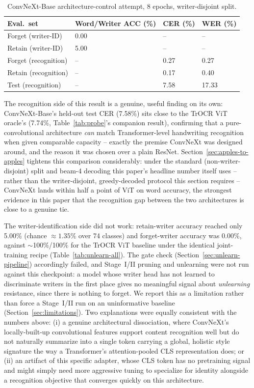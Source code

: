 \documentclass[a4paper,fleqn]{cas-dc}
\begin{document}
\begin{table}[h]
\caption{ConvNeXt-Base architecture-control attempt, 8 epochs, writer-disjoint split.}
\label{tab:convnext}
\begin{tabular*}{\tblwidth}{@{}LLLL@{}}
\toprule
Eval.\ set & Word/Writer ACC (\%) & CER (\%) & WER (\%) \\
\midrule
Forget (writer-ID) & 0.00 & -- & -- \\
Retain (writer-ID) & 5.00 & -- & -- \\
Forget (recognition) & -- & 0.27 & 0.27 \\
Retain (recognition) & -- & 0.17 & 0.40 \\
Test (recognition) & -- & 7.58 & 17.33 \\
\bottomrule
\end{tabular*}
\end{table}

The recognition side of this result is a genuine, useful finding on its
own: ConvNeXt-Base's held-out test CER (7.58\%) sits close to the TrOCR ViT
oracle's (7.74\%, Table~\ref{tab:probe}'s companion result), confirming
that a pure-convolutional architecture \emph{can} match Transformer-level
handwriting recognition when given comparable capacity -- exactly the
premise ConvNeXt was designed around, and the reason it was chosen over a
plain ResNet. Section~\ref{sec:apples-to-apples} tightens this comparison
considerably: under the standard (non-writer-disjoint) split and beam-4
decoding this paper's headline number itself uses -- rather than the
writer-disjoint, greedy-decoded protocol this section requires -- ConvNeXt
lands within half a point of ViT on word accuracy, the strongest evidence
in this paper that the recognition gap between the two architectures is
close to a genuine tie.

The writer-identification side did not work: retain-writer accuracy
reached only 5.00\% (chance $\approx 1.35\%$ over 74 classes) and
forget-writer accuracy was 0.00\%, against $\sim$100\%/100\% for the TrOCR
ViT baseline under the identical joint-training recipe
(Table~\ref{tab:unlearn-all}). The gate check
(Section~\ref{sec:unlearn-pipeline}) accordingly failed, and Stage~I/II
pruning and unlearning were not run against this checkpoint: a model whose
writer head has not learned to discriminate writers in the first place
gives no meaningful signal about \emph{unlearning} resistance, since there
is nothing to forget. We report this as a limitation rather than force a
Stage~I/II run on an uninformative baseline (Section~\ref{sec:limitations}).
Two explanations were equally consistent with the numbers above: (i) a
genuine architectural dissociation, where ConvNeXt's locally-built-up
convolutional features support content recognition well but do not
naturally summarize into a single token carrying a global, holistic style
signature the way a Transformer's attention-pooled CLS representation
does; or (ii) an artifact of this specific adapter, whose CLS token has no
pretraining signal and might simply need more aggressive tuning to
specialize for identity alongside a recognition objective that converges
quickly on this architecture.
\end{document}
